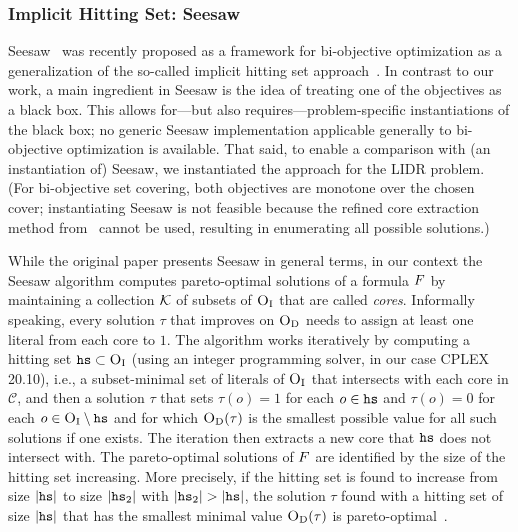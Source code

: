\subsubsection{Implicit Hitting Set: Seesaw\label{sec:seesaw}}

Seesaw~\autocite{DBLP:conf/cp/JanotaMSM21} was recently proposed as a framework for bi-objective optimization as a generalization of the so-called implicit hitting set approach~\autocite{DBLP:conf/cp/DaviesB13,DBLP:conf/cp/IgnatievPLM15,DBLP:conf/kr/SaikkoWJ16,DBLP:conf/cade/FazekasBB18,DBLP:conf/kr/SaikkoDAJ18}.
In contrast to our work, a main ingredient in Seesaw is the idea of treating one of the objectives as a black box.
This allows for---but also requires---problem-specific instantiations of the black box;
no generic Seesaw implementation applicable generally to bi-objective optimization is available.
That said, to enable a comparison with (an instantiation of) Seesaw, we instantiated the approach for the LIDR problem.
(For bi-objective set covering, both objectives are monotone over the chosen cover;
instantiating Seesaw is not feasible because the refined core extraction method from~\textcite{DBLP:conf/cp/JanotaMSM21} cannot be used, resulting in enumerating all possible solutions.)

While the original paper presents Seesaw in general terms, in our context the Seesaw algorithm computes pareto-optimal solutions of a formula $F$ by maintaining a collection $\mathcal{K}$ of subsets of $\textsc{O}_{\text{I}}$ that are called \emph{cores}.
Informally speaking, every solution $\tau$ that improves on $\textsc{O}_{\text{D}}$ needs to assign at least one literal from each core to $1$.
The algorithm works iteratively by computing a hitting set $\texttt{hs} \subset \textsc{O}_{\text{I}}$ (using an integer programming solver, in our case CPLEX 20.10), i.e., a subset-minimal set of literals of $\textsc{O}_{\text{I}}$ that intersects with each core in $\mathcal{C}$, and then a solution $\tau$ that sets $\tau(o) = 1$ for each $o \in \texttt{hs}$ and $\tau(o) = 0$ for each $o \in \textsc{O}_{\text{I}} \setminus \texttt{hs}$ and for which $\textsc{O}_{\text{D}}(\tau)$ is the smallest possible value for all such solutions if one exists.
The iteration then extracts a new core that $\texttt{hs}$ does not intersect with.
The pareto-optimal solutions of $F$ are identified by the size of the hitting set increasing.
More precisely, if the hitting set is found to increase from size $|\texttt{hs}|$ to size $|\texttt{hs}_2|$ with $|\hs_2|>|\hs|$, the solution $\tau$ found with a hitting set of size $|\texttt{hs}|$ that has the smallest minimal value $\textsc{O}_{\text{D}}(\tau)$ is pareto-optimal~\autocite{DBLP:conf/cp/JanotaMSM21}.


